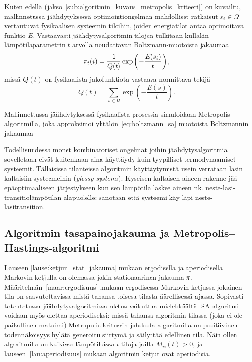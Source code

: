 Kuten edellä (jakso~\ref{sub:algoritmin_kuvaus_metropolis_kriteeri}) on kuvailtu,
mallinnetussa jäähdytyksessä optimointiongelman mahdolliset ratkaisut $s_i \in \Omega$ vertautuvat fysikaalisen systeemin tiloihin,
joiden energiatilat antaa optimoitava funktio $E$.
Vastaavasti jäähdytysalgoritmin tilojen tulkitaan kullakin lämpötilaparametrin $t$ arvolla noudattavan Boltzmann-muotoista jakaumaa
\begin{equation}
    \label{eq:boltzmann_sa}
    \mathbf{\pi}_t(i) = \frac{1}{Q(t)} \exp \left(-\frac{E(s_i)}{t}\right),
\end{equation}
missä $Q(t)$ on fysikaalista jakofunktiota vastaava normittava tekijä
\begin{equation}
    Q(t) = \sum_{s \in \Omega} \exp \left(-\frac{E(s)}{t}\right).
\end{equation}

Mallinnettussa jäähdytyksessä fysikaalista prosessia simuloidaan Metropolis-algoritmilla,
joka approksimoi yhtälön~\eqref{eq:boltzmann_sa} muotoista Boltzmannin jakaumaa.

Todellisuudessa monet kombinatoriset ongelmat joihin jäähdytysalgoritmia sovelletaan eivät kuitenkaan aina käyttäydy kuin tyypilliset termodynaamiset systeemit.
Tällaisissa tilanteissa algoritmin käyttäytymistä usein verrataan lasin kaltaisiin systeemeihin (\emph{glassy systems}).
Kyseisen kaltaisen aineen rakenne jää epäoptimaaliseen järjestykseen kun sen lämpötila laskee aineen nk. neste-lasi-transitiolämpötilan alapuolelle:
sanotaan että systeemi käy läpi neste-lasitransition.
~\cite[][luku 6.6]{salamonetal}

\subsection{Algoritmin tasapainojakauma ja Metropolis--Hastings-algoritmi}
\label{sub:metropolis_hastings_algoritmi}

Lauseen \ref{lause:ketjun_stat_jakauma} mukaan ergodisella ja aperiodisella Markovin ketjulla on olemassa jokin stationaarinen jakauma $\mathbf{\pi}$.
Määritelmän~\ref{maar:ergodisuus} mukaan ergodisessa Markovin ketjussa jokainen tila on saavutettavissa mistä tahansa toisesa tilasta äärellisessä ajassa.
Sopivasti toteutetussa jäähdytysalgoritmissa oletus vaikuttaa mielekkäältä.
SA-algoritmi voidaan myös olettaa aperiodiseksi:
missä tahansa algoritmin tilassa (joka ei ole paikallinen maksimi) Metropolis-kriteerin johdosta
algoritmilla on positiivinen todennäköisyys hylätä generoitu siirtymä ja säilyttää edellinen tila.
Näin ollen algoritmilla on kaikissa lämpötiloissa $t$ tiloja joilla $M_{ii}(t) > 0$,
ja lauseen~\ref{lau:aperiodisuus} mukaan algoritmin ketjut ovat aperiodisia.

